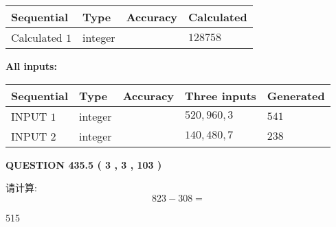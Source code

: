 \documentclass{ctexart}
\begin{document}
   
   
   
\noindent{}
   
   
  
  
\noindent\begin{tabular}{|l|l|l|l|}
\hline
 Sequential & Type & Accuracy & Calculated \\ 
\hline
 
 
  Calculated $  1 $ & integer &  & 
  $ 128758 $ 
 \\  \hline  
 \end{tabular}
   
   
   
   
\noindent\vspace{0.1in}\hspace{-0.08in} {\textbf{\Large{All inputs: }}}
   
   
  
  
\noindent\begin{tabular}{|l|l|l|l|l|}
\hline
 Sequential & Type & Accuracy & Three inputs & Generated \\ 
\hline
 
 
  INPUT $  1 $ & integer &  & $
 520
 , 
 960
 , 
 3
 $ & $ 541 $ 
 \\  \hline  
 
 
  INPUT $  2 $ & integer &  & $
 140
 , 
 480
 , 
 7
 $ & $ 238 $ 
 \\  \hline  
 \end{tabular}
   
   
  
\vspace{0.2in}
  
{\textbf{\Large{QUESTION
435.5 
 ( 3 , 3 , 103 )
}}}
  
  
 
请计算:
\begin{equation}
823 -   %
308 = \nonumber
\end{equation}
 
 
 
\noindent{}
 
 

515
 
 
\noindent{}
 
 

 
 
 
\noindent{}
 
\end{document}
